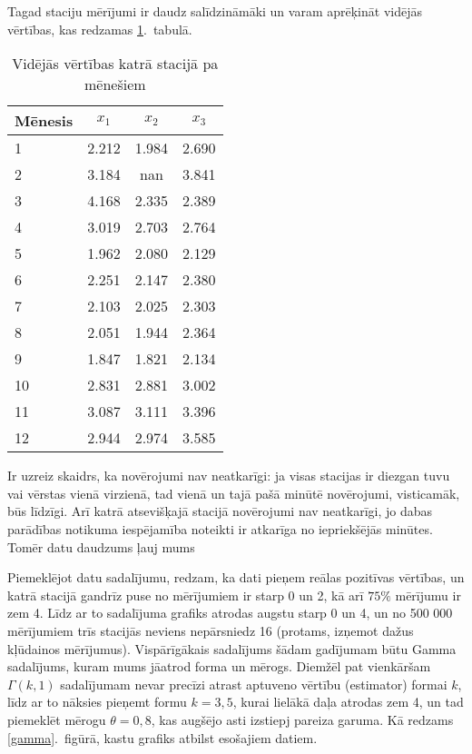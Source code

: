 \documentclass[12pt,a4paper]{article}
\begin{document}
Tagad staciju mērījumi ir daudz salīdzināmāki un varam aprēķināt vidējās vērtības, kas redzamas \ref{tab:videjais}.~tabulā.
\begin{table}
    \caption{Vidējās vērtības katrā stacijā pa mēnešiem}\label{tab:videjais}
    \centering
    \begin{tabular}{l|c c c}
        \toprule
        Mēnesis & \(x_1\) & \(x_2\) & \(x_3\) \\
        \midrule
        1  &  2.212  &  1.984  &  2.690 \\
        2  &  3.184  &  nan  &  3.841 \\
        3  &  4.168  &  2.335  &  2.389 \\
        4  &  3.019  &  2.703  &  2.764 \\
        5  &  1.962  &  2.080  &  2.129 \\
        6  &  2.251  &  2.147  &  2.380 \\
        7  &  2.103  &  2.025  &  2.303 \\
        8  &  2.051  &  1.944  &  2.364 \\
        9  &  1.847  &  1.821  &  2.134 \\
        10  &  2.831  &  2.881  &  3.002 \\
        11  &  3.087  &  3.111  &  3.396 \\
        12  &  2.944  &  2.974  &  3.585\\
        \bottomrule
    \end{tabular}
\end{table}

Ir uzreiz skaidrs, ka novērojumi nav neatkarīgi: ja visas stacijas ir diezgan tuvu vai vērstas vienā virzienā, tad vienā un tajā pašā minūtē novērojumi, visticamāk, būs līdzīgi. Arī katrā atsevišķajā stacijā novērojumi nav neatkarīgi, jo dabas parādības notikuma iespējamība noteikti ir atkarīga no iepriekšējās minūtes. Tomēr datu daudzums ļauj mums 

Piemeklējot datu sadalījumu, redzam, ka dati pieņem reālas pozitīvas vērtības, un katrā stacijā gandrīz puse no mērījumiem ir starp 0 un 2, kā arī \(75\%\) mērījumu ir zem 4. Līdz ar to sadalījuma grafiks atrodas augstu starp 0 un 4, un no 500 000 mērījumiem trīs stacijās neviens nepārsniedz 16 (protams, izņemot dažus kļūdainos mērījumus). Vispārīgākais sadalījums šādam gadījumam būtu Gamma sadalījums, kuram mums jāatrod forma un mērogs. 
Diemžēl pat vienkāršam \(\Gamma(k, 1)\) sadalījumam nevar precīzi atrast aptuveno vērtību (estimator) formai \(k\), līdz ar to nāksies pieņemt formu \(k=3,5\), kurai lielākā daļa atrodas zem 4, un tad piemeklēt mērogu \(\theta=0,8\), kas augšējo asti izstiepj pareiza garuma. Kā redzams \ref{gamma}.~figūrā, kastu grafiks atbilst esošajiem datiem.
\end{document}
